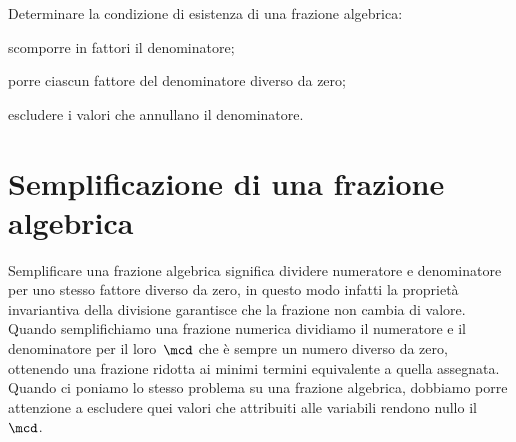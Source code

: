 \begin{procedura}
Determinare la condizione di esistenza di una frazione algebrica:
\begin{enumeratea}
\item scomporre in fattori il denominatore;
\item porre ciascun fattore del denominatore diverso da zero;
\item escludere i valori che annullano il denominatore.
\end{enumeratea}
\end{procedura}


\section{Semplificazione di una frazione algebrica}
\label{sec:frazalg_semplificazione}

Semplificare una frazione algebrica significa dividere numeratore e 
denominatore per uno stesso fattore diverso da zero, in questo modo infatti la 
proprietà invariantiva della divisione garantisce che la frazione non cambia 
di valore.
Quando semplifichiamo una frazione numerica dividiamo il numeratore e il 
denominatore per il loro~$\mcd$
che è sempre un numero diverso da zero, ottenendo una frazione ridotta ai 
minimi termini equivalente a quella assegnata.
Quando ci poniamo lo stesso problema su una frazione algebrica, dobbiamo porre 
attenzione a escludere quei valori che attribuiti alle variabili rendono nullo 
il~$\mcd$.

